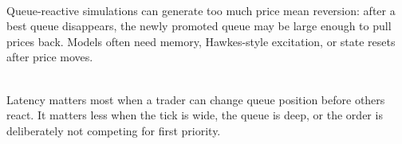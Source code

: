 \documentclass[a4paper,oneside,openany]{book}
\begin{document}
\begin{caveat} \\
Queue-reactive simulations can generate too much price mean reversion: after a best queue disappears, the newly promoted queue may be large enough to pull prices back. Models often need memory, Hawkes-style excitation, or state resets after price moves.
\end{caveat}

\begin{principle} \\
Latency matters most when a trader can change queue position before others react. It matters less when the tick is wide, the queue is deep, or the order is deliberately not competing for first priority.
\end{principle}
\end{document}
